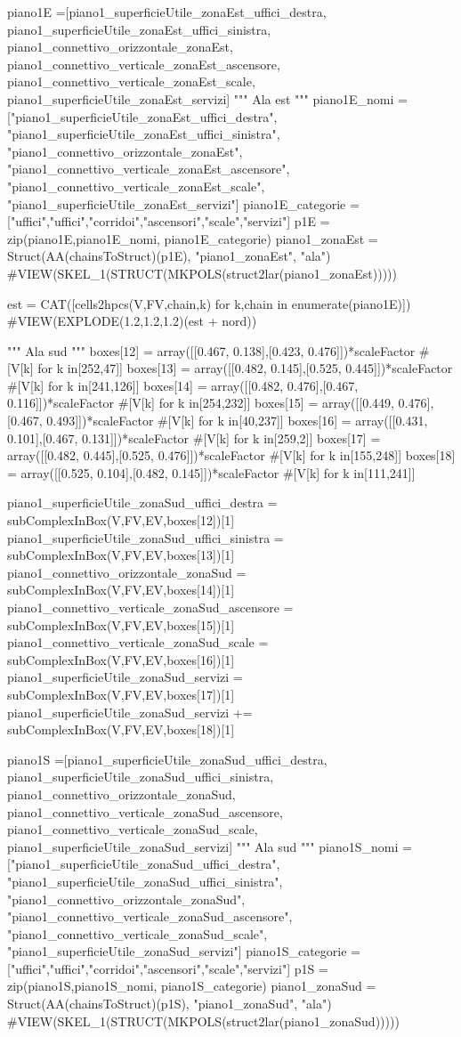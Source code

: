 piano1E =[piano1_superficieUtile_zonaEst_uffici_destra, piano1_superficieUtile_zonaEst_uffici_sinistra, piano1_connettivo_orizzontale_zonaEst, piano1_connettivo_verticale_zonaEst_ascensore, piano1_connettivo_verticale_zonaEst_scale, piano1_superficieUtile_zonaEst_servizi]
""" Ala est """
piano1E_nomi =["piano1_superficieUtile_zonaEst_uffici_destra", "piano1_superficieUtile_zonaEst_uffici_sinistra", "piano1_connettivo_orizzontale_zonaEst", "piano1_connettivo_verticale_zonaEst_ascensore", "piano1_connettivo_verticale_zonaEst_scale", "piano1_superficieUtile_zonaEst_servizi"]
piano1E_categorie =["uffici","uffici","corridoi","ascensori","scale","servizi"]
p1E = zip(piano1E,piano1E_nomi, piano1E_categorie)
piano1_zonaEst = Struct(AA(chainsToStruct)(p1E), "piano1_zonaEst", "ala")
#VIEW(SKEL_1(STRUCT(MKPOLS(struct2lar(piano1_zonaEst)))))

est = CAT([cells2hpcs(V,FV,chain,k) for k,chain in enumerate(piano1E)])
#VIEW(EXPLODE(1.2,1.2,1.2)(est + nord))

""" Ala sud """
boxes[12] = array([[0.467, 0.138],[0.423, 0.476]])*scaleFactor #[V[k] for k in[252,47]]
boxes[13] = array([[0.482, 0.145],[0.525, 0.445]])*scaleFactor #[V[k] for k in[241,126]]
boxes[14] = array([[0.482, 0.476],[0.467, 0.116]])*scaleFactor #[V[k] for k in[254,232]]
boxes[15] = array([[0.449, 0.476],[0.467, 0.493]])*scaleFactor #[V[k] for k in[40,237]]
boxes[16] = array([[0.431, 0.101],[0.467, 0.131]])*scaleFactor #[V[k] for k in[259,2]]
boxes[17] = array([[0.482, 0.445],[0.525, 0.476]])*scaleFactor #[V[k] for k in[155,248]]
boxes[18] = array([[0.525, 0.104],[0.482, 0.145]])*scaleFactor #[V[k] for k in[111,241]]

piano1_superficieUtile_zonaSud_uffici_destra = subComplexInBox(V,FV,EV,boxes[12])[1]
piano1_superficieUtile_zonaSud_uffici_sinistra = subComplexInBox(V,FV,EV,boxes[13])[1]
piano1_connettivo_orizzontale_zonaSud = subComplexInBox(V,FV,EV,boxes[14])[1]
piano1_connettivo_verticale_zonaSud_ascensore = subComplexInBox(V,FV,EV,boxes[15])[1]
piano1_connettivo_verticale_zonaSud_scale = subComplexInBox(V,FV,EV,boxes[16])[1]
piano1_superficieUtile_zonaSud_servizi = subComplexInBox(V,FV,EV,boxes[17])[1]
piano1_superficieUtile_zonaSud_servizi += subComplexInBox(V,FV,EV,boxes[18])[1]

piano1S =[piano1_superficieUtile_zonaSud_uffici_destra, piano1_superficieUtile_zonaSud_uffici_sinistra, piano1_connettivo_orizzontale_zonaSud, piano1_connettivo_verticale_zonaSud_ascensore, piano1_connettivo_verticale_zonaSud_scale, piano1_superficieUtile_zonaSud_servizi]
""" Ala sud """
piano1S_nomi =["piano1_superficieUtile_zonaSud_uffici_destra", "piano1_superficieUtile_zonaSud_uffici_sinistra", "piano1_connettivo_orizzontale_zonaSud", "piano1_connettivo_verticale_zonaSud_ascensore", "piano1_connettivo_verticale_zonaSud_scale", "piano1_superficieUtile_zonaSud_servizi"]
piano1S_categorie =["uffici","uffici","corridoi","ascensori","scale","servizi"]
p1S = zip(piano1S,piano1S_nomi, piano1S_categorie)
piano1_zonaSud = Struct(AA(chainsToStruct)(p1S), "piano1_zonaSud", "ala")
#VIEW(SKEL_1(STRUCT(MKPOLS(struct2lar(piano1_zonaSud)))))
    
